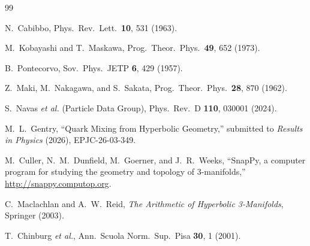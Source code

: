 \documentclass[11pt,a4paper]{article}
\begin{document}
\begin{thebibliography}{99}

N.~Cabibbo, Phys.\ Rev.\ Lett.\ \textbf{10}, 531 (1963).

M.~Kobayashi and T.~Maskawa, Prog.\ Theor.\ Phys.\ \textbf{49}, 652 (1973).

B.~Pontecorvo, Sov.\ Phys.\ JETP \textbf{6}, 429 (1957).

Z.~Maki, M.~Nakagawa, and S.~Sakata,
Prog.\ Theor.\ Phys.\ \textbf{28}, 870 (1962).

S.~Navas \textit{et al.} (Particle Data Group),
Phys.\ Rev.\ D \textbf{110}, 030001 (2024).

M.~L.~Gentry,
``Quark Mixing from Hyperbolic Geometry,''
submitted to \textit{Results in Physics} (2026), EPJC-26-03-349.

M.~Culler, N.~M.~Dunfield, M.~Goerner, and J.~R.~Weeks,
``SnapPy, a computer program for studying the geometry and topology
of 3-manifolds,'' \url{http://snappy.computop.org}.

C.~Maclachlan and A.~W.~Reid,
\emph{The Arithmetic of Hyperbolic 3-Manifolds},
Springer (2003).

T.~Chinburg \textit{et al.},
Ann.\ Scuola Norm.\ Sup.\ Pisa \textbf{30}, 1 (2001).

\end{thebibliography}
\end{document}
